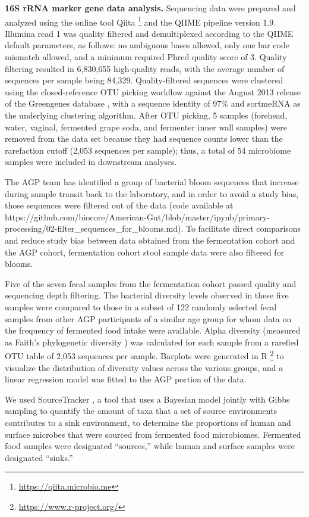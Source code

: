 \textbf{16S rRNA marker gene data analysis.} Sequencing data were prepared and analyzed
using the online tool Qiita \footnote{\url{https://qiita.microbio.me}} and the QIIME
pipeline \cite{Caporaso2010} version 1.9. Illumina read 1 was quality filtered and
demultiplexed according to the QIIME default parameters, as follows: no ambiguous bases
allowed, only one bar code mismatch allowed, and a minimum required Phred quality score of 3.
Quality filtering resulted in 6,830,655 high-quality reads, with the average number of
sequences per sample being 84,329. Quality-filtered sequences were clustered using
the closed-reference OTU picking workflow against the August 2013 release of the Greengenes
database \cite{DeSantis2006}, with a sequence identity of 97\% and sortmeRNA \cite{Kopylova2012}
as the underlying clustering algorithm. After OTU picking, 5 samples (forehead, water,
vaginal, fermented grape soda, and fermenter inner wall samples) were removed from the
data set because they had sequence counts lower than the rarefaction cutoff (2,053
sequences per sample); thus, a total of 54 microbiome samples were included in downstream analyses.

The AGP team has identified a group of bacterial bloom sequences that increase
during sample transit back to the laboratory, and in order to avoid a study bias,
those sequences were filtered out of the data (code available at
https://github.com/biocore/American-Gut/blob/master/ipynb/primary-processing/02-filter\_sequences\_for\_blooms.md).
To facilitate direct comparisons and reduce study bias between data obtained from
the fermentation cohort and the AGP cohort, fermentation cohort stool sample
data were also filtered for blooms.

Five of the seven fecal samples from the fermentation cohort passed quality and
sequencing depth filtering. The bacterial diversity levels observed in these five
samples were compared to those in a subset of 122 randomly selected fecal samples
from other AGP participants of a similar age group for whom data on the frequency
of fermented food intake were available. Alpha diversity (measured as Faith’s
phylogenetic diversity \cite{Faith1992}) was calculated for each sample from a
rarefied OTU table of 2,053 sequences per sample. Barplots were generated in
R \footnote{\url{https://www.r-project.org/}} to visualize the distribution of
diversity values across the various groups, and a linear regression model was
fitted to the AGP portion of the data.

We used SourceTracker \cite{Knights2011}, a tool that uses a Bayesian model
jointly with Gibbs sampling to quantify the amount of taxa that a set of source
environments contributes to a sink environment, to determine the proportions of
human and surface microbes that were sourced from fermented food microbiomes.
Fermented food samples were designated “sources,” while human and surface samples
were designated “sinks.”

